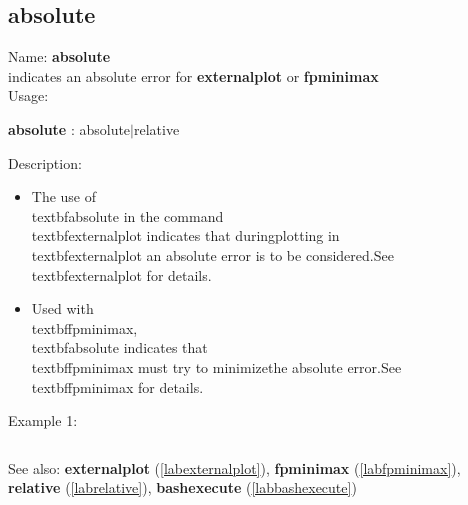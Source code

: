 \subsection{absolute}
\label{lababsolute}
\noindent Name: \textbf{absolute}\\
indicates an absolute error for \textbf{externalplot} or \textbf{fpminimax}\\
\noindent Usage: 
\begin{center}
\textbf{absolute} : \textsf{absolute$|$relative}\\
\end{center}
\noindent Description: \begin{itemize}

\item The use of \\textbf{absolute} in the command \\textbf{externalplot} indicates that during\n   plotting in \\textbf{externalplot} an absolute error is to be considered.\n    \n   See \\textbf{externalplot} for details.\n
\item Used with \\textbf{fpminimax}, \\textbf{absolute} indicates that \\textbf{fpminimax} must try to minimize\n   the absolute error.\n    \n   See \\textbf{fpminimax} for details.\n\end{itemize}
\noindent Example 1: 
\begin{center}\begin{minipage}{15cm}\begin{Verbatim}[frame=single]
\end{Verbatim}
\end{minipage}\end{center}
See also: \textbf{externalplot} (\ref{labexternalplot}), \textbf{fpminimax} (\ref{labfpminimax}), \textbf{relative} (\ref{labrelative}), \textbf{bashexecute} (\ref{labbashexecute})
